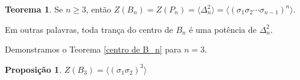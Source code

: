 \documentclass[a4paper,portuguese,11pt,twoside, leqno]{book}
\theoremstyle{definition}
\newtheorem{theorem}{Teorema}[section]
\newtheorem{prop}{Proposição}[section]
\begin{document}
	
	\begin{theorem}
		\label{centro de B_n}
		Se $n\geq 3$, então $Z(B_n) = Z(P_n) = \langle \Delta_n^2 \rangle = \langle (\sigma_1\sigma_2\cdots\sigma_{n-1})^n \rangle$.
	\end{theorem}
	
	\par\vspace{0.3cm} Em outras palavras, toda trança do centro de $B_n$ é uma potência de $\Delta_n^2$.%
	
	\par\vspace{0.3cm} Demonstramos o Teorema \eqref{centro de B_n} para $n=3$.
	
	\begin{prop}
		$Z(B_3) = \langle (\sigma_1\sigma_2)^3 \rangle$
	\end{prop}
	
\end{document}
